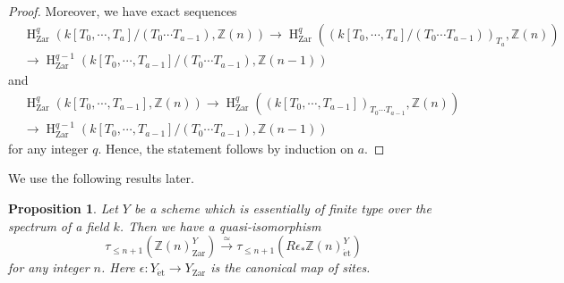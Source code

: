 \documentclass{article}
\newtheorem{prop}[thm]{\indent \sc Proposition}
\newcommand{\et}{\mathrm{\acute{e}t}}
\newcommand{\Zar}{\mathrm{Zar}}
\newcommand{\HO}{\operatorname{H}}
\begin{document}
\begin{proof}
Moreover, we have exact sequences
%
\begin{align*}
&\HO^{q}_{\Zar}\left(
k[T_{0}, \cdots, T_{a}]/
(T_{0}\cdots T_{a-1}),
\mathbb{Z}(n)
\right)    
\to
\HO^{q}_{\Zar}\left(
(k[T_{0}, \cdots, T_{a}]/
(T_{0}\cdots T_{a-1}))_{T_{a}},
\mathbb{Z}(n)
\right)   \\  
&\to
\HO^{q-1}_{\Zar}\left(
k[T_{0}, \cdots, T_{a-1}]/
(T_{0}\cdots T_{a-1}),
\mathbb{Z}(n-1)
\right)    
\end{align*}
%
and
%
\begin{align*}
&\HO^{q}_{\Zar}\left(
k[T_{0}, \cdots, T_{a-1}],
\mathbb{Z}(n)
\right)
\to
\HO^{q}_{\Zar}\left(
(k[T_{0}, \cdots, T_{a-1}])_{T_0\cdots T_{a-1}},
\mathbb{Z}(n)
\right)  \\
&\to
\HO^{q-1}_{\Zar}\left(
k[T_{0}, \cdots, T_{a-1}]/(T_{0}\cdots T_{a-1}),
\mathbb{Z}(n-1)
\right)
\end{align*}
%
for any integer $q$. Hence, the statement follows by induction on $a$.
\end{proof}
%

We use the following results later.

%
\begin{prop}\upshape\label{pBL}
Let $Y$ be a scheme which is essentially of finite type over the spectrum of a field $k$. Then
we have a quasi-isomorphism
%
\begin{equation}\label{posBL}
\tau_{\leq n+1}\left(
\mathbb{Z}(n)^{Y}_{\Zar}
\right)
\xrightarrow{\simeq}
\tau_{\leq n+1}\left(
R\epsilon_{*}\mathbb{Z}(n)_{\et}^{Y}
\right)
\end{equation}
%
for any integer $n$. 
Here $\epsilon: Y_{\et}\to Y_{\Zar}$ is the canonical map of sites.
\end{prop}
%
\end{document}
